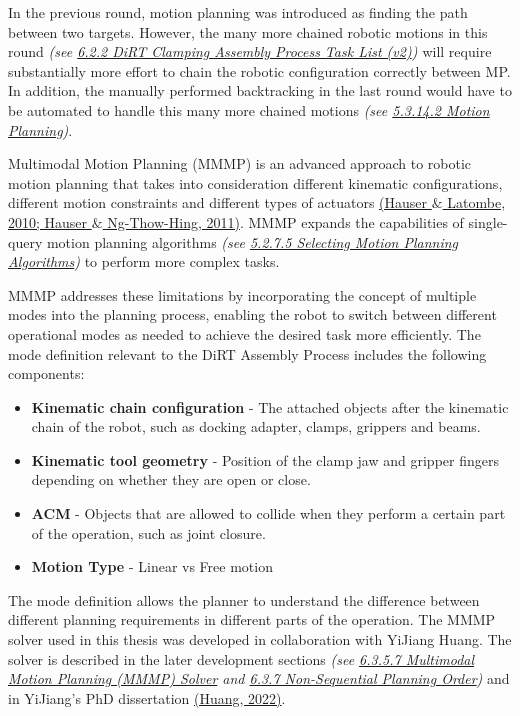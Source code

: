 \documentclass[11pt]{book}
\begin{document}
In the previous round, motion planning was introduced as finding the path between two targets. However, the many more chained robotic motions in this round \textit{\textcolor[HTML]{B7B7B7}{(see \uline{6.2.2 DiRT Clamping Assembly Process Task List (v2)}) }}will require substantially more effort to chain the robotic configuration correctly between MP. In addition, the manually performed backtracking in the last round would have to be automated to handle this many more chained motions \textit{\textcolor[HTML]{B7B7B7}{(see \uline{5.3.14.2 Motion Planning})}}. 

Multimodal Motion Planning (MMMP) is an advanced approach to robotic motion planning that takes into consideration different kinematic configurations, different motion constraints and different types of actuators \href{https://www.zotero.org/google-docs/?a7FuIN}{(Hauser $\&$ Latombe, 2010; Hauser $\&$ Ng-Thow-Hing, 2011)}. MMMP expands the capabilities of single-query motion planning algorithms \textit{\textcolor[HTML]{B7B7B7}{(see \uline{5.2.7.5 Selecting Motion Planning Algorithms})}} to perform more complex tasks.

MMMP addresses these limitations by incorporating the concept of multiple modes into the planning process, enabling the robot to switch between different operational modes as needed to achieve the desired task more efficiently. The mode definition relevant to the DiRT Assembly Process includes the following components:

\begin{itemize}
	\item \textbf{Kinematic chain configuration }- The attached objects after the kinematic chain of the robot, such as docking adapter, clamps, grippers and beams.

	\item \textbf{Kinematic tool geometry} - Position of the clamp jaw and gripper fingers depending on whether they are open or close.

	\item \textbf{ACM }- Objects that are allowed to collide when they perform a certain part of the operation, such as joint closure.

	\item \textbf{Motion Type} - Linear vs Free motion

\end{itemize}
The mode definition allows the planner to understand the difference between different planning requirements in different parts of the operation. The MMMP solver used in this thesis was developed in collaboration with YiJiang Huang. The solver is described in the later development sections \textit{\textcolor[HTML]{B7B7B7}{(see \uline{6.3.5.7 Multimodal Motion Planning (MMMP) Solver} and \uline{6.3.7 Non-Sequential Planning Order})}} and in YiJiang’s PhD dissertation \href{https://www.zotero.org/google-docs/?R37lZz}{(Huang, 2022)}.
\end{document}
